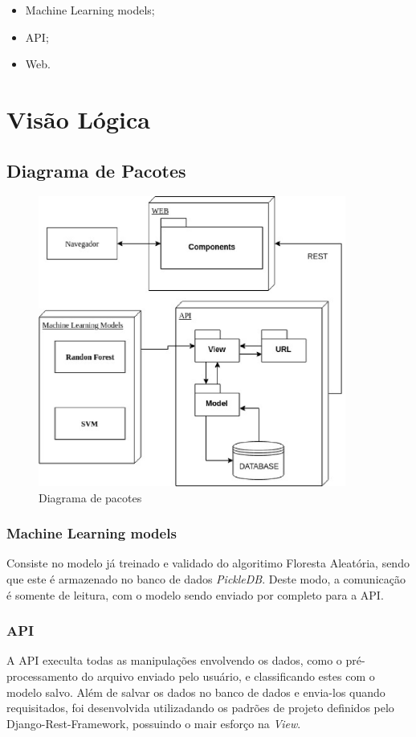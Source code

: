 \begin{anexosenv}
	\begin{itemize}
		\item Machine Learning models;
		\item API;
		\item Web.
	\end{itemize}


    \section{Visão Lógica}
    \subsection{Diagrama de Pacotes}
    \begin{figure}[!htb]
		\centering
		\includegraphics[width=0.9\textwidth]{figuras/diagrama_pacotes.eps}
		\caption{Diagrama de pacotes}
		\label{diagramadepacotes}
	\end{figure}
	\subsubsection{Machine Learning models}
	Consiste no modelo já treinado e validado do algoritimo Floresta Aleatória, sendo que este é armazenado no banco de dados \textit{PickleDB}. Deste modo, a comunicação é somente de leitura, com o modelo sendo enviado por completo para a API.
	\subsubsection{API}
	A API execulta todas as manipulações envolvendo os dados, como o pré-processamento do arquivo enviado pelo usuário, e classificando estes com o modelo salvo. Além de salvar os dados no banco de dados e envia-los quando requisitados, foi desenvolvida utilizadando os padrões de projeto definidos pelo Django-Rest-Framework, possuindo o mair esforço na \textit{View}.


\end{anexosenv}
